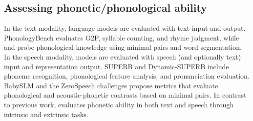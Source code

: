 \subsection{Assessing phonetic/phonological ability}
In the text modality, language models are evaluated with text input and output. 
PhonologyBench \cite{suvarna2024phonologybench} evaluates G2P, syllable counting, and rhyme judgment, while \citet{bunzeck2025smalllm} and \citet{goriely2025wordseg} probe phonological knowledge using minimal pairs and word segmentation.
In the speech modality, models are evaluated with speech (and optionally text) input and representation output. 
SUPERB \cite{yang21c_interspeech} and Dynamic-SUPERB \cite{huang2025dynamic} include phoneme recognition, phonological feature analysis, and pronunciation evaluation.
BabySLM \cite{lavechin2023babyslm} and the ZeroSpeech challenges \cite{nguyen2020zerospeech} propose metrics that evaluate phonological and acoustic-phonetic contrasts based on minimal pairs.
In contrast to previous work, \bench evaluates phonetic ability in both text and speech through intrinsic and extrinsic tasks. 